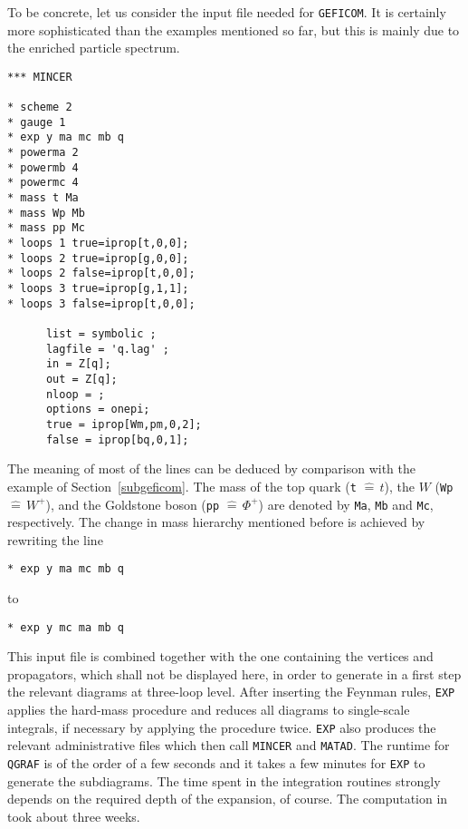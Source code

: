 To be concrete, let us consider the input file needed for {\tt GEFICOM}.
It is certainly more sophisticated than the examples mentioned so far,
but this is mainly due to the enriched
particle spectrum.
%
\begin{verbatim}
*** MINCER

* scheme 2
* gauge 1
* exp y ma mc mb q
* powerma 2
* powermb 4
* powermc 4
* mass t Ma 
* mass Wp Mb
* mass pp Mc
* loops 1 true=iprop[t,0,0];
* loops 2 true=iprop[g,0,0];
* loops 2 false=iprop[t,0,0];
* loops 3 true=iprop[g,1,1];
* loops 3 false=iprop[t,0,0];

      list = symbolic ;
      lagfile = 'q.lag' ;
      in = Z[q];
      out = Z[q];
      nloop = ;
      options = onepi;
      true = iprop[Wm,pm,0,2];
      false = iprop[bq,0,1];
\end{verbatim}
%
The meaning of most of the lines can be deduced by comparison with the
example of Section~\ref{subgeficom}.
The mass of the top quark ({\tt t} $\widehat =
\,t$), the $W$ ({\tt Wp} $\widehat = \,W^+$), and the Goldstone boson
({\tt pp} $\widehat =\, \Phi^+$) are denoted by {\tt Ma}, {\tt Mb} and
{\tt Mc}, respectively.  The change in mass hierarchy mentioned before is
achieved by rewriting the line
\begin{verbatim}
* exp y ma mc mb q
\end{verbatim}
to
\begin{verbatim}
* exp y mc ma mb q
\end{verbatim}
This input file is combined together with the one containing
the vertices and propagators, which shall not be displayed here,
in order to generate in a first step the relevant diagrams
at three-loop level. After inserting the Feynman
rules, {\tt EXP} applies
the hard-mass procedure and reduces all diagrams to single-scale
integrals, if necessary by applying the procedure twice.
{\tt EXP} also produces the relevant administrative files which
then call {\tt MINCER} and {\tt MATAD}. 
The runtime for {\tt QGRAF} is of the order of a few seconds
and it takes a few minutes for {\tt EXP} to generate the
subdiagrams.
The time spent in the integration routines strongly depends on the
required depth of the expansion, of course. The computation
in~\cite{HarSeiSte97} took about three weeks.

